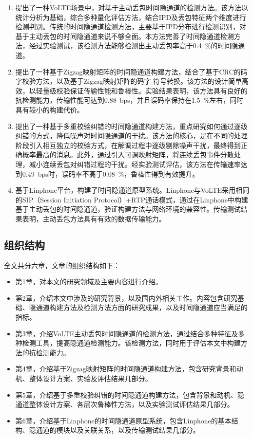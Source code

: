 \begin{enumerate}
    \item 提出了一种VoLTE场景中，对基于主动丢包时间隐通道的检测方法。该方法以统计分析为基础，综合多种量化评估方法，结合IPD及丢包特征两个维度进行检测判别。传统的时间隐通道检测方法，主要基于IPD分布进行检测识别，对基于主动丢包的时间隐通道来说不够全面。本方法完善了时间隐通道检测方法，经过实验测试，该检测方法能够检测出主动丢包率高于{0.4\ \%}的时间隐通道。
    \item 提出了一种基于Zigzag映射矩阵的时间隐通道构建方法，结合了基于CRC的码字校验方法，以及基于Zigzag映射矩阵的码字-符号转换。该方法的设计简单高效，以轻量级校验保证传输性能和鲁棒性。实验结果表明，该方法具有良好的抗检测能力，传输性能可达到{0.88\ bps}，并且误码率保持在{1.5\ \%}左右，同时具有较小的构建代价。
    \item 提出了一种基于多重校验纠错的时间隐通道构建方法，重点研究如何通过逐级纠错的方式，降低噪声对时间隐通道的干扰。该方法的核心，是在不同的处理阶段引入相互独立的校验方式，在解调过程中逐级剔除噪声干扰，最终得到正确概率最高的消息。此外，通过引入可调映射矩阵，将连续丢包事件分散处理，减小连续丢包对纠错过程的干扰。经实验测试评估，该方法在传输速率达到{0.49\ bps}时，误码率不高于{0.08\ \%}，鲁棒性得到有效提升。
    \item 基于Linphone平台，构建了时间隐通道原型系统。Linphone与VoLTE采用相同的SIP（Session Initiation Protocol）+RTP通话模式，通过在Linphone中构建基于主动丢包的时间隐通道，验证构建方法与网络环境的兼容性。传输测试结果表明，主动丢包方法具有有效的数据传输能力。
\end{enumerate}

\subsection{组织结构}
\label{sec:intro:work:struct}

全文共分六章，文章的组织结构如下：
\begin{itemize}
    \item 第1章，对本文的研究领域及主要内容进行介绍。
    \item 第2章，介绍本文中涉及的研究背景，以及国内外相关工作。内容包含研究基础、隐通道构建方法及检测方法方面的研究成果，以及时间隐通道应当满足的指标。
    \item 第3章，介绍VoLTE主动丢包时间隐通道的检测方法，通过结合多种特征及多种检测工具，提高隐通道检测能力。该检测方法，同时用于评估本文中构建方法的抗检测能力。
    \item 第4章，介绍基于Zigzag映射矩阵的时间隐通道构建方法，包含研究背景和动机、整体设计方案、实验及评估结果几部分。
    \item 第5章，介绍基于多重校验纠错的时间隐通道构建方法，包含背景和动机、隐通道整体设计方案、各层次鲁棒性方法，以及实验测试评估结果几部分。
    \item 第6章，介绍基于Linphone的时间隐通道原型系统，包含Linphone的基本结构、隐通道的模块以及关联关系，以及传输测试结果几部分。
\end{itemize}